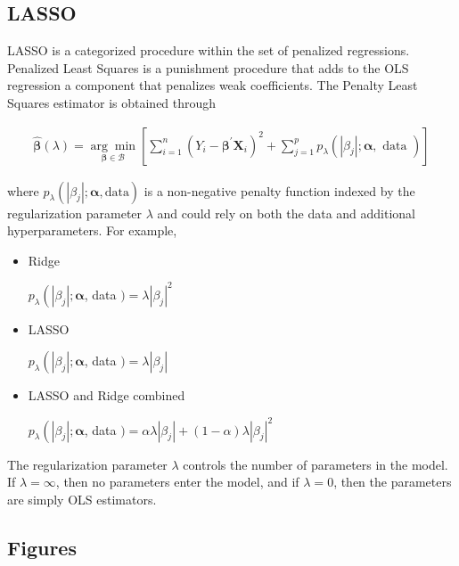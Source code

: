 \subsection{LASSO}\label{apen:lasso}

LASSO is a categorized procedure within the set of penalized regressions. Penalized Least Squares is a punishment procedure that adds to the OLS regression a component that penalizes weak coefficients. The Penalty Least Squares estimator is obtained through

\begin{align*}
	\widehat{\boldsymbol{\beta}}(\lambda)=\underset{\boldsymbol{\beta} \in \mathcal{B}}{\arg \min }\left[\sum_{i=1}^n\left(Y_i-\boldsymbol{\beta}^{\prime} \boldsymbol{X}_i\right)^2+\sum_{j=1}^p p_\lambda\left(\left|\beta_j\right| ; \boldsymbol{\alpha}, \text { data }\right)\right]
\end{align*}

where $p_\lambda\left(\left|\beta_j\right| ; \boldsymbol{\alpha}, \text{data}\right)$ is a non-negative penalty function indexed by the regularization parameter $\lambda$ and could rely on both the data and additional hyperparameters. For example,

\begin{itemize}
	\item Ridge
	
	$p_\lambda\left(\left|\beta_j\right| ; \boldsymbol{\alpha}\right.$, data $)=\lambda\left|\beta_j\right|^2$
	\item LASSO
	
	$p_\lambda\left(\left|\beta_j\right| ; \boldsymbol{\alpha}\right.$, data $)=\lambda\left|\beta_j\right|$
	\item LASSO and Ridge combined
	
	$p_\lambda\left(\left|\beta_j\right| ; \boldsymbol{\alpha}\right.$, data $)=\alpha \lambda\left|\beta_j\right|+(1-\alpha) \lambda\left|\beta_j\right|^2$
\end{itemize}

The regularization parameter $\lambda$ controls the number of parameters in the model. If $\lambda = \infty$, then no parameters enter the model, and if $\lambda = 0$, then the parameters are simply OLS estimators.



\newpage
\subsection{Figures}


